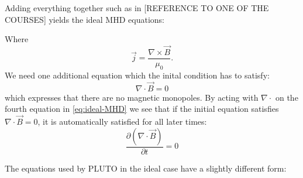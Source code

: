 Adding everything together such as in [REFERENCE TO ONE OF THE COURSES] yields the ideal MHD equations:

{\centering 
\noindent {}
\par}

Where $$\vec{j} = \frac{\nabla\times \vec{B}}{\mu_0}. $$ We need one additional equation which the inital condition has to satisfy:
\begin{equation*}
	\nabla\cdot\vec{B}=0
\end{equation*}
which expresses that there are no magnetic monopoles. By acting with $\nabla\cdot$ on the fourth equation in \autoref{eq:ideal-MHD} we see that if the initial equation satisfies $\nabla\cdot\vec{B}=0$, it is automatically satisfied for all later times:
\begin{equation*}
	\frac{\partial (\nabla\cdot\vec{B})}{\partial t} = 0
\end{equation*}

The equations used by PLUTO in the ideal case have a slightly different form: 

{\centering 
\noindent {}
\par}

